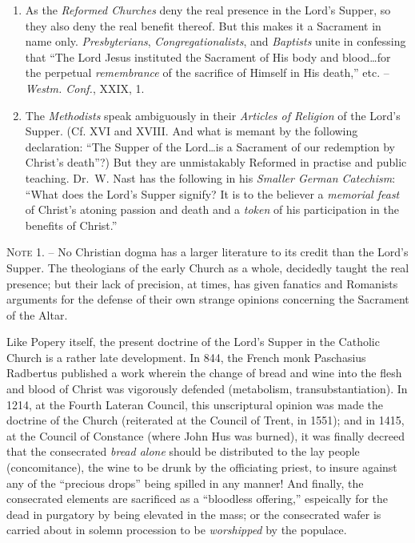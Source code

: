 \documentclass[
]{book}
\begin{document}
\begin{enumerate}
\def\labelenumi{\arabic{enumi}.}
\item
  As the \emph{Reformed Churches} deny the real presence in the Lord's Supper, so they also deny the real benefit thereof. But this makes it a Sacrament in name only. \emph{Presbyterians}, \emph{Congregationalists}, and \emph{Baptists} unite in confessing that ``The Lord Jesus instituted the Sacrament of His body and blood\ldots for the perpetual \emph{remembrance} of the sacrifice of Himself in His death,'' etc. -- \emph{Westm. Conf.}, XXIX, 1.
\item
  The \emph{Methodists} speak ambiguously in their \emph{Articles of Religion} of the Lord's Supper. (Cf. XVI and XVIII. And what is memant by the following declaration: ``The Supper of the Lord\ldots is a Sacrament of our redemption by Christ's death''?) But they are unmistakably Reformed in practise and public teaching. Dr.~W. Nast has the following in his \emph{Smaller German Catechism}: ``What does the Lord's Supper signify? It is to the believer a \emph{memorial feast} of Christ's atoning passion and death and a \emph{token} of his participation in the benefits of Christ.''
\end{enumerate}

\textsc{Note 1. --} No Christian dogma has a larger literature to its credit than the Lord's Supper. The theologians of the early Church as a whole, decidedly taught the real presence; but their lack of precision, at times, has given fanatics and Romanists arguments for the defense of their own strange opinions concerning the Sacrament of the Altar.

Like Popery itself, the present doctrine of the Lord's Supper in the Catholic Church is a rather late development. In 844, the French monk Paschasius Radbertus published a work wherein the change of bread and wine into the flesh and blood of Christ was vigorously defended (metabolism, transubstantiation). In 1214, at the Fourth Lateran Council, this unscriptural opinion was made the doctrine of the Church (reiterated at the Council of Trent, in 1551); and in 1415, at the Council of Constance (where John Hus was burned), it was finally decreed that the consecrated \emph{bread alone} should be distributed to the lay people (concomitance), the wine to be drunk by the officiating priest, to insure against any of the ``precious drops'' being spilled in any manner! And finally, the consecrated elements are sacrificed as a ``bloodless offering,'' espeically for the dead in purgatory by being elevated in the mass; or the consecrated wafer is carried about in solemn procession to be \emph{worshipped} by the populace.
\end{document}
